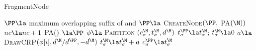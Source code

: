 \begin{algorithm}[t!]
	\caption{FragmentNode} \label{alg:fragmentnode}
	\begin{algorithmic}[1]

	
		\State $\PP \la$ maximum overlapping suffix  of \M \space and \Seq
		\State $\PP \la $ \textsc{CreateNode}$(\PP,$ \textsc{PA}$(\M))$
		\State $nc \la nc + 1$
		\State \textsc{PA}(\M) $\la \PP$
		\For{$\sigma \in \Sigma$}
			\State $\phi \la$ \textsc{Partition} $(c^\M_\sigma, t^\M_\sigma,d^\M)$
			\State $t^\PP_\sigma \la t^\M_\sigma$;  $t^\M_\sigma \la 0$
				\State $a \la$ \textsc{DrawCRP}$(\phi[i],d^\M / d^\PP,-d^\M)$
				\State $t_\sigma^\M \la t_\sigma^\M + a$
			\EndFor
			\State $c^\PP_\sigma \la t^\M_\sigma$
		\EndFor
	\EndFunction
		\end{algorithmic}
\end{algorithm}

